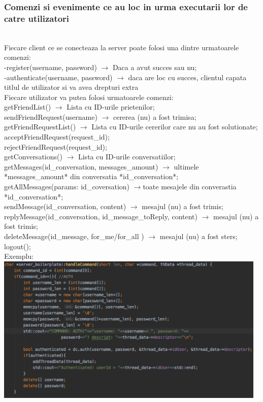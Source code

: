 \documentclass[runningheads]{llncs}
\begin{document}
\subsubsection{Comenzi si evenimente ce au loc in urma executarii lor de catre utilizatori}\hfill\\

Fiecare client ce se conecteaza la server poate folosi una dintre urmatoarele comenzi:\\
-register(username, password) $\rightarrow$ Daca a avut succes sau nu;\\
-authenticate(username, password) $\rightarrow$ daca are loc cu succes, clientul capata titlul de utilizator si va avea drepturi extra\\

Fiecare utilizator va putea folosi urmatoarele comenzi:\\
getFriendList() $\rightarrow$ Lista cu ID-urile prietenilor;\\
sendFriendRequest(username) $\rightarrow$ cererea (nu) a fost trimisa;\\
getFriendRequestList() $\rightarrow$ Lista cu ID-urile cererilor care nu au fost solutionate;\\
acceptFriendRequest(request\_id);\\
rejectFriendRequest(request\_id);\\
getConversations() $\rightarrow$ Lista cu ID-urile conversatiilor;\\
getMessages(id\_conversation, messages\_amount) $\rightarrow$ ultimele  *messages\_amount* din conversatia *id\_conversation*;\\
getAllMessages(params: id\_coversation) $\rightarrow$toate mesajele din converastia
*id\_conversation*;\\
sendMessage(id\_conversation, content) $\rightarrow$ mesajul (nu) a fost trimis;\\
replyMessage(id\_conversation, id\_message\_toReply, content) $\rightarrow$ mesajul (nu) a fost trimis;\\
deleteMessage(id\_message, for\_me/for\_all ) $\rightarrow$ mesajul (nu) a fost sters;\\
logout();\\
Exemplu:
\includegraphics[width=130mm,scale=1]{retele_pics/auth_handle.png}\\
\end{document}
